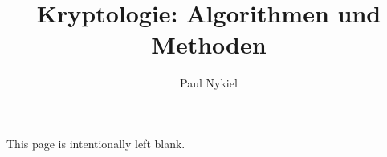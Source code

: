 \documentclass[10pt]{report}
\title{Kryptologie: Algorithmen und Methoden}
\author{Paul Nykiel}
\begin{document}
    \maketitle
    \pagebreak
    This page is intentionally left blank.
    \pagebreak
    \tableofcontents
    \pagebreak
    
    
    
\end{document}
